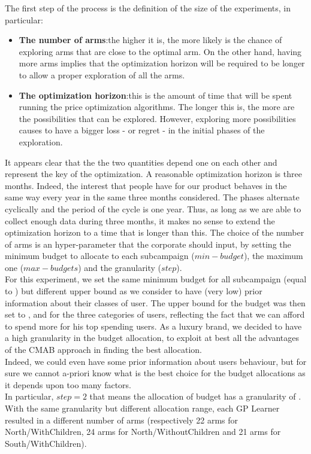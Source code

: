 The first step of the process is the definition of the size of the experiments, in particular:
\begin{itemize}
	\item \textbf{The number of arms}:\@  the higher it is, the more likely is the chance of exploring
	arms that are close to the optimal arm. On the other hand, having more arms
	implies that the optimization horizon will be required to be longer to allow a
	proper exploration of all the arms.
	\item \textbf{The optimization horizon}:\@  this is the amount of time that will be spent
	running the price optimization algorithms. The longer this is, the more are
	the possibilities that can be explored. However, exploring more possibilities
	causes to have a bigger loss - or regret - in the initial phases of the exploration.
\end{itemize} 
It appears clear that the the two quantities depend one on each other
and represent the key of the optimization. A reasonable optimization horizon is
three months. Indeed, the interest that people have for our product behaves in the same way every
year in the same three months considered. The phases alternate cyclically and the period of the cycle is one year.
Thus, as long as we are able to collect enough data during three months, it makes no
sense to extend the optimization horizon to a time that is longer than this.
The choice of the number of arms is an hyper-parameter that the corporate should input, by setting the minimum budget to allocate to each subcampaign ($min-budget$), the maximum one ($max-budgets$) and the granularity ($step$).
\\For this experiment, we set the same minimum budget for all subcampaign (equal to ) but different upper bound as we consider to have (very low) prior information about their classes of user. The upper bound for the budget was then set to ,  and  for the three categories of users, reflecting the fact that we can afford to spend more for his top spending users.
As a luxury brand, we decided to have a high granularity in the budget allocation, to exploit at best all the advantages of the CMAB approach in finding the best allocation.
\\Indeed, we could even have some prior information about users behaviour, but for sure we cannot a-priori know what is the best choice for the budget allocations as it depends upon too many factors.
\\In particular, $step=2$ that means the allocation of budget has a granularity of . With the same granularity but different allocation range, each GP Learner resulted in a different number of arms (respectively 22 arms for North/WithChildren, 24 arms for North/WithoutChildren and 21 arms for South/WithChildren).